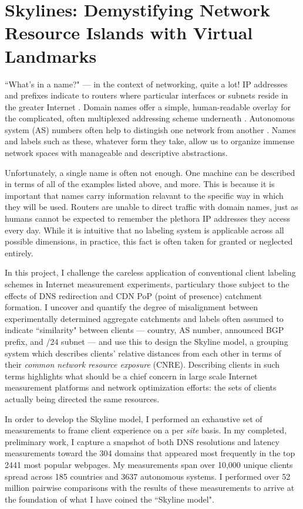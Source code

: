 \section{Skylines: Demystifying Network Resource Islands with Virtual Landmarks}

``What's in a name?" --- in the context of networking, quite a lot! IP addresses and prefixes
indicate to routers where particular interfaces or subnets reside in the greater Internet
\cite{bgp}. Domain
names offer a simple, human-readable overlay for the complicated, often multiplexed addressing
scheme underneath \cite{dns}. Autonomous system (AS) numbers often help to distingish one network
from another \cite{asn}.
Names and labels such as these, whatever form they take, allow us to organize immense network spaces
with manageable and descriptive abstractions.

Unfortunately, a single name is often not enough. One machine can be described in terms of all of
the examples listed above, and more. This is because it is important that names carry information
relavant to the specific way in which they will be used. Routers are unable to direct traffic with
domain names, just as humans cannot be expected to remember the plethora IP addresses they access
every day. While it is intuitive that no labeling system is applicable across all possible
dimensions, in practice, this fact is often taken for granted or neglected entirely.

In this project, I challenge the careless application of conventional client labeling schemes in
Internet measurement experiments, particulary those subject to the effects of DNS redirection and
CDN PoP (point of presence) catchment formation. I uncover and quantify the degree of misalignment
between experimentally determined aggregate catchments and labels often assumed to indicate
``similarity" between clients --- country, AS number, announced BGP prefix, and /24 subnet --- and
use this to design the Skyline model, a grouping system which describes clients' relative distances
from each other in terms of their \emph{common network resource exposure} (CNRE). Describing clients in such
terms highlights what should be a chief concern in large scale Internet measurement platforms and
network optimization efforts: the sets of clients actually being directed the same resources.

In order to develop the Skyline model, I performed an exhaustive set of measurements to frame
client experience on a per \emph{site} basis. In my completed, preliminary work, I capture a
snapshot of both DNS resolutions and latency measurements toward the 304 domains that appeared most
frequently in the top 2441 most popular webpages. My measurements span over 10,000 unique
clients spread across 185 countries and 3637 autonomous systems. I performed over 52 million pairwise
comparisons with the results of these measurements to arrive at the foundation of what I have
coined the ``Skyline model". 

